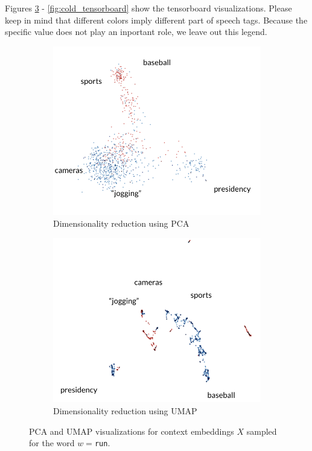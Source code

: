 \documentclass[a4paper,12pt,twoside,openright]{report}
\begin{document}
Figures \ref{fig:run_tensorboard} - \ref{fig:cold_tensorboard} show  the tensorboard visualizations.
Please keep in mind that different colors imply different part of speech tags. 
Because the specific value does not play an inportant role, we leave out this legend.

\begin{figure}[H]
\begin{subfigure}{.45\textwidth}
  \centering
  \includegraphics[width=.8\linewidth]{./assets/analysis/run_pca.png}
  \caption{Dimensionality reduction using PCA}
  \label{fig:sfig1}
\end{subfigure}%
\hfill
\begin{subfigure}{.45\textwidth}
  \centering
  \includegraphics[width=.8\linewidth]{./assets/analysis/run_umap.png}
  \caption{Dimensionality reduction using UMAP}
  \label{fig:sfig2}
\end{subfigure}
\caption{PCA and UMAP visualizations for context embeddings $X$ sampled for the word $w=$\texttt{run}. }
\label{fig:run_tensorboard}
\end{figure}
\end{document}
